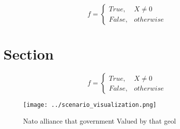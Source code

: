\documentclass[a4paper]{article}
\begin{document}
\begin{equation}   f =
\begin{cases} True, & X \neq 0\\
False, & otherwise
\end{cases}
\end{equation}

\section{Section}

\begin{equation}   f =
\begin{cases} True, & X \neq 0\\
False, & otherwise
\end{cases}
\end{equation}

\begin{figure}
\centering
\texttt{[image: ../scenario\_visualization.png]}
\caption{Nato alliance that government Valued by that geol
}
\end{figure}
 
\end{document}
